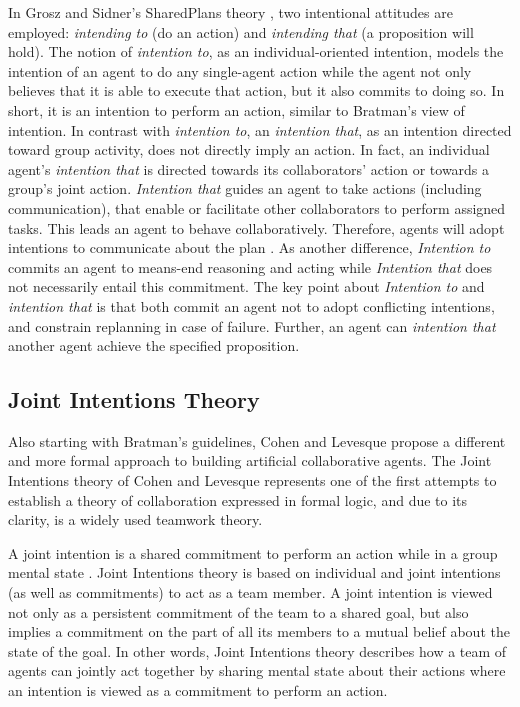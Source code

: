 \documentclass[12pt]{report}
\begin{document}
In Grosz and Sidner's SharedPlans theory \cite{grosz:plans-discourse}, two
intentional attitudes are employed: \textit{intending to} (do an action) and
\textit{intending that} (a proposition will hold). The notion of
\textit{intention to}, as an individual-oriented intention, models the intention
of an agent to do any single-agent action while the agent not only believes that
it is able to execute that action, but it also commits to doing so. In short,
it is an intention to perform an action, similar to Bratman's view of intention.
In contrast with \textit{intention to}, an \textit{intention that}, as an
intention directed toward group activity, does not directly imply an action. In
fact, an individual agent's \textit{intention that} is directed towards its
collaborators' action or towards a group's joint action. \textit{Intention that}
guides an agent to take actions (including communication), that enable or
facilitate other collaborators to perform assigned tasks. This leads an agent to
behave collaboratively. Therefore, agents will adopt intentions to communicate
about the plan \cite{grosz:collaboration}. As another difference,
\textit{Intention to} commits an agent to means-end reasoning and acting
\cite{bratman:intentions-plans} while \textit{Intention that} does not
necessarily entail this commitment. The key point about \textit{Intention to}
and \textit{intention that} is that both commit an agent not to adopt
conflicting intentions, and constrain replanning in case of failure. Further, an
agent can \textit{intention that} another agent achieve the specified
proposition.

\subsection{Joint Intentions Theory}
\label{sec:joint-intentions}

Also starting with Bratman's guidelines, Cohen and Levesque propose a different
and more formal approach to building artificial collaborative agents. The Joint
Intentions theory of Cohen and Levesque \cite{cohen:teamwork,
cohen:intention-commitment, cohen:persistence-intention-commitment,
cohen:intentions, levesque:acting-together} represents one of the first attempts
to establish a theory of collaboration expressed in formal logic, and due to its
clarity, is a widely used teamwork theory.

A joint intention is a shared commitment to perform an action while in a group
mental state \cite{cohen:intention-commitment}. Joint Intentions theory is based
on individual and joint intentions (as well as commitments) to act as a team
member. A joint intention is viewed not only as a persistent commitment of the
team to a shared goal, but also implies a commitment on the part of all its
members to a mutual belief about the state of the goal. In other words, Joint
Intentions theory describes how a team of agents can jointly act together by
sharing mental state about their actions where an intention is viewed as a
commitment to perform an action.
\end{document}
